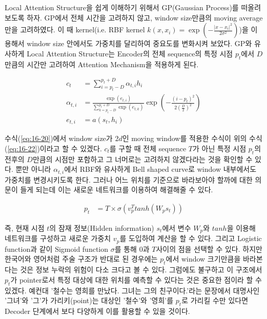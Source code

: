 \documentclass[draft=false]{oblivoir}
\begin{document}
Local Attention Structure을 쉽게 이해하기 위해서 GP(Gaussian Process)를 떠올려 보도록 하자. GP에서 전체 시간을 고려하지 않고, window size만큼의 moving average만을 고려하였다. 이 때 kernel(i.e. RBF kernel $k(x, x_i) = \exp{(-\frac{|x-x_i|^{2}}{2\sigma^{2}})}$)을 이용해서 window size 안에서도 가중치를 달리하여 중요도를 변화시켜 보았다. GP와 유사하게 Local Attention Structure는 Encoder의 전체 sequence의 특정 시점 $p_t$에서 $D$만큼의 시간만 고려하여 Attention Mechanism을 적용하게 된다.

\begin{equation}
	\begin{split}
		c_t & = \sum_{i=p_t - D}^{p_t + D}\alpha_{t,i}h_i\\
        \alpha_{t,i} & = \frac{\exp{(e_{t,i})}}{\sum_{k=p_t - D}^{p_t + D}\exp{(e_{t,k})}}\exp{(-\frac{(i-p_t)^{2}}{2(\frac{D}{2})^{2}})}\\
        e_{t,i} & = a(s_t, h_i)
	\end{split}
	\label{eq:16-22}
\end{equation}

수식(\ref{eq:16-20})에서 window size가 $2d$인 moving window를 적용한 수식이 위의 수식(\ref{eq:16-22})이라고 할 수 있겠다. $c_t$를 구할 때 전체 sequence $T$가 아닌 특정 시점 $p_t$의 전후의 $D$만큼의 시점만 포함하고 그 너머로는 고려하지 않겠다라는 것을 확인할 수 있다. 뿐만 아니라 $\alpha_{t,i}$에서 RBF와 유사하게 Bell shaped curve로 window 내부에서도 가중치를 변경시키도록 한다. 그러나 어느 위치를 기준으로 바라보아야 할까에 대한 의문이 들게 되는데 이는 새로운 네트워크를 이용하여 해결해줄 수 있다.

\begin{equation}
	\begin{split}
		p_t & = T \times \sigma(v_{p}^{T}tanh(W_p s_t))
	\end{split}
	\label{eq:16-23}
\end{equation}

즉, 현재 시점 $t$의 잠재 정보(Hidden information) $s_t$에서 변수 $W_p$와 $tanh$을 이용해 네트워크를 구성하고 새로운 가중치 $v_p$를 도입하여 계산을 할 수 있다. 그리고 Logistic function과 같이 Sigmoid function $\sigma$를 통해 0과 $T$사이의 점을 선택할 수 있다. 하지만 한국어와 영어처럼 주술 구조가 반대로 된 경우에는 $p_t$에서 window 크기만큼을 바라본다는 것은 정보 누락의 위험이 다소 크다고 볼 수 있다. 그럼에도 불구하고 이 구조에서 $p_t$가 pointer로서 특정 대상에 대한 위치를 예측할 수 있다는 것은 중요한 점이라 할 수 있겠다. 예컨대 '철수는 영희를 만났다. 그녀는 그의 친구이다.'라는 문장에서 대명사인 '그녀'와 '그'가 가리키(point)는 대상인 '철수'와 '영희'를 $p_t$로 가리킬 수만 있다면 Decoder 단계에서 보다 다양하게 이를 활용할 수 있을 것이다. 
\end{document}
